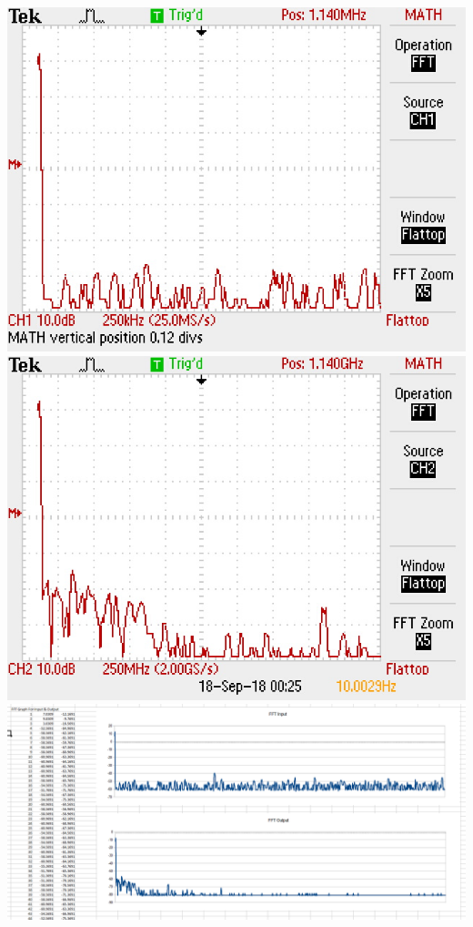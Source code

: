 \documentclass[12pt]{article}
\begin{document}
			\begin{center}
				\includegraphics[scale=0.6]{fft1.jpg}\\
				\vspace{1cm}
				\includegraphics[scale=0.6]{fft2.jpg}\\
				\vspace{1cm}
				\includegraphics[scale=0.15]{efft.png}
			\end{center}
\end{document}
